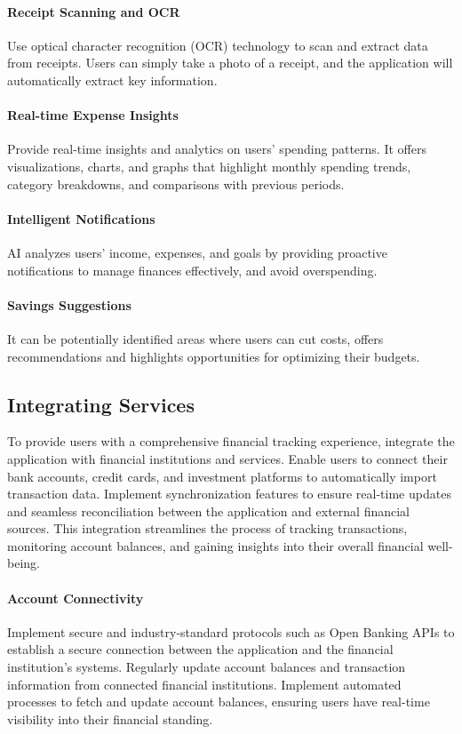 \paragraph{Receipt Scanning and OCR}
Use optical character recognition (OCR) technology to scan and extract data from receipts. Users can simply take a photo 
of a receipt, and the application will automatically extract key information.

\paragraph{Real-time Expense Insights}
Provide real-time insights and analytics on users' spending patterns. It offers visualizations, charts, and graphs that 
highlight monthly spending trends, category breakdowns, and comparisons with previous periods.

\paragraph{Intelligent Notifications}
AI analyzes users' income, expenses, and goals by providing proactive notifications to manage finances effectively, and 
avoid overspending.

\paragraph{Savings Suggestions}
It can be potentially identified areas where users can cut costs, offers recommendations and highlights opportunities 
for optimizing their budgets.


\subsection{Integrating Services}

To provide users with a comprehensive financial tracking experience, integrate the application with financial 
institutions and services. Enable users to connect their bank accounts, credit cards, and investment platforms 
to automatically import transaction data. Implement synchronization features to ensure real-time updates and 
seamless reconciliation between the application and external financial sources. This integration streamlines 
the process of tracking transactions, monitoring account balances, and gaining insights into their overall financial 
well-being.

\paragraph{Account Connectivity}
Implement secure and industry-standard protocols such as Open Banking APIs to establish a secure connection between 
the application and the financial institution's systems. Regularly update account balances and transaction information 
from connected financial institutions. Implement automated processes to fetch and update account balances, ensuring 
users have real-time visibility into their financial standing.

